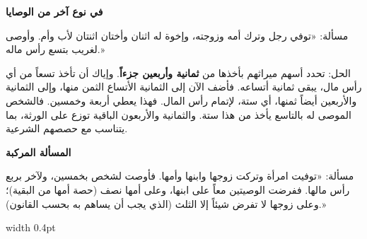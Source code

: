 \documentclass[11pt,a4paper,openany,oneside]{book}
\begin{document}
\newpage

\noindent\begin{minipage}[t]{0.48\textwidth}
\raggedleft

\begin{Arabic}
\textbf{في نوع آخر من الوصايا}

مسألة: «توفي رجل وترك أمه وزوجته، وإخوة له اثنان وأختان اثنتان لأب وأم. وأوصى لغريب بتسع رأس ماله.»

الحل: تحدد أسهم ميراثهم بأخذها من \textbf{ثمانية وأربعين جزءاً}. وإياك أن تأخذ تسعاً من أي رأس مال، يبقى ثمانية أتساعه. فأضف الآن إلى الثمانية الأتساع الثمن منها، وإلى الثمانية والأربعين أيضاً ثمنها، أي ستة، لإتمام رأس المال. فهذا يعطي أربعة وخمسين. فالشخص الموصى له بالتاسع يأخذ من هذا ستة. والثمانية والأربعون الباقية توزع على الورثة، بما يتناسب مع حصصهم الشرعية.

\textbf{المسألة المركبة}

مسألة: «توفيت امرأة وتركت زوجها وابنها وأمها. فأوصت لشخص بخمسين، ولآخر بربع رأس مالها. ففرضت الوصيتين معاً على ابنها، وعلى أمها نصف (حصة أمها من البقية)؛ وعلى زوجها لا تفرض شيئاً إلا الثلث (الذي يجب أن يساهم به بحسب القانون).»
\end{Arabic}

\end{minipage}%
\hfill\vrule width 0.4pt\hfill
\end{document}
